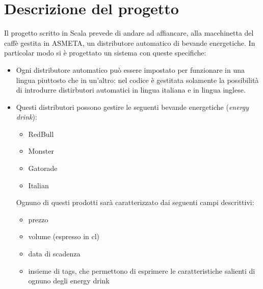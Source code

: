 \section{Descrizione del progetto}
Il progetto scritto in Scala prevede di andare ad affiancare, alla macchinetta del caffè gestita in ASMETA, un distributore automatico di bevande energetiche.
In particolar modo si è progettato un sistema con queste specifiche:
\begin{itemize}
	\item Ogni distributore automatico può essere impostato per funzionare in una lingua piuttosto che in un'altro: nel codice è gestitata solamente la possibilità di introdurre distirbutori automatici in lingua italiana e in lingua inglese.
	
	\item Questi distributori possono gestire le seguenti bevande energetiche (\textit{energy drink}):
	\begin{itemize}
		\item RedBull
		\item Monster
		\item Gatorade
		\item Italian
	\end{itemize}
	Ognuno di questi prodotti sarà caratterizzato dai seguenti campi descrittivi:
	\begin{itemize}
		\item prezzo
		\item volume (espresso in cl)
		\item data di scadenza
		\item insieme di tags, che permettono di esprimere le caratteristiche salienti di ognuno degli energy drink
	\end{itemize}
\end{itemize}


